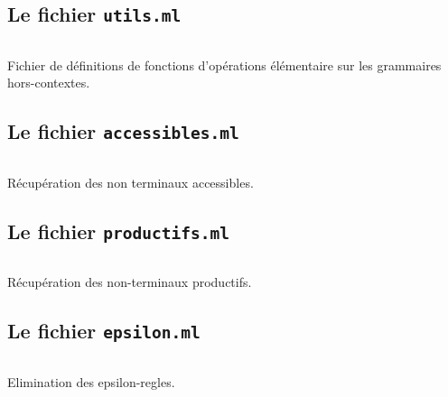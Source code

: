 \documentclass[11pt,a4paper]{article}
\newenvironment{longlisting}{\captionsetup{type=listing}}{}
\def\code#1{\texttt{#1}} %
\begin{document}
\newpage

\subsection{Le fichier \code{utils.ml}}

\begin{longlisting}
    \inputminted{ocaml}{utils.ml}
    \caption{Fichier de définitions de fonctions d'opérations élémentaire sur les grammaires hors-contextes.}
\label{lst:long}
\end{longlisting}


\newpage

\subsection{Le fichier \code{accessibles.ml}}

\begin{longlisting}
    \inputminted{ocaml}{accessibles.ml}
    \caption{Récupération des non terminaux accessibles.}
\label{lst:long}
\end{longlisting}

\newpage

\subsection{Le fichier \code{productifs.ml}}

\begin{longlisting}
    \inputminted{ocaml}{productifs.ml}
    \caption{Récupération des non-terminaux productifs.}
\label{lst:long}
\end{longlisting}

\newpage

\subsection{Le fichier \code{epsilon.ml}}

\begin{longlisting}
    \inputminted{ocaml}{epsilon.ml}
    \caption{Elimination des epsilon-regles.}
\label{lst:long}
\end{longlisting}
\end{document}
